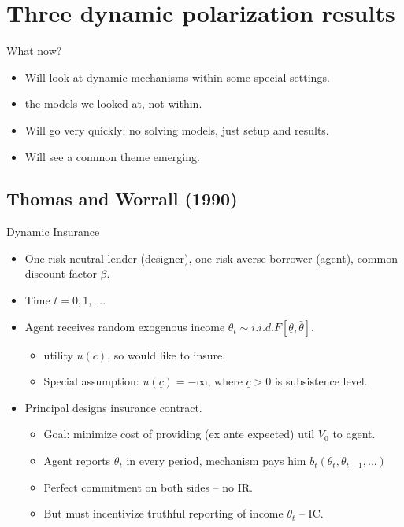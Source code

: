 \documentclass[english,10pt
,aspectratio=169
]{beamer}
\begin{document}
\section{Three dynamic polarization results}

\begin{frame}{What now?}
\begin{itemize}
	\item Will look at dynamic mechanisms within some special settings.
	\item {} the models we looked at, not \alert{within}.
	\item Will go very quickly: no solving models, just setup and results.
	\item Will see a common theme emerging.
\end{itemize}
\end{frame}


\subsection{Thomas and Worrall (1990)}

\begin{frame}{Dynamic Insurance \citep{thomas_income_1990}}
\begin{itemize}
	\item One risk-neutral lender (designer), one \alert{risk-averse} borrower (agent), common discount factor $\beta$.
	\item Time $t=0,1,...$.
	\item Agent receives random exogenous income $\theta_t \sim i.i.d. F[\underline{\theta},\bar{\theta}]$.
	\begin{itemize}
		\item {} utility $u(c)$, so would like to insure.
		\item Special assumption: $u(\underline{c}) = -\infty$, where $\underline{c}>0$ is subsistence level.
	\end{itemize}
	\item Principal designs insurance contract.
	\begin{itemize}
		\item Goal: minimize cost of providing (ex ante expected) util $V_0$ to agent.
		\item Agent reports $\theta_t$ in every period, mechanism pays him $b_t(\theta_t, \theta_{t-1}, ...)$
		\item Perfect commitment on both sides -- no IR.
		\item But must incentivize truthful reporting of income $\theta_t$ -- IC.
	\end{itemize}
\end{itemize}
\end{frame}
\end{document}
